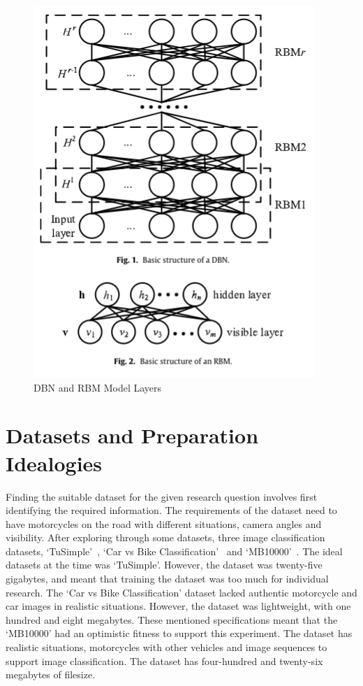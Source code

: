 \documentclass[12pt]{report} %
\begin{document}
		\begin{figure}[htp]
			\centering
			\includegraphics[width=0.75\columnwidth]{Figures/literature_review/proposal/DBNRBMLayers.png}
			\caption{DBN and RBM Model Layers~\cite{zhao_parallel_2019}}
			\label{fig:dbnRBMLayers}
		\end{figure}

	\section{Datasets and Preparation Idealogies}
		Finding the suitable dataset for the given research question involves first identifying the required information. The requirements of the dataset need to have motorcycles on the road with different situations, camera angles and visibility. After exploring through some datasets, three image classification datasets, `TuSimple'~\cite{jeong_end--end_2017}, `Car vs Bike Classification'~\cite{deepnets_car_nodate} and `MB10000'~\cite{espinosa_motorcycle_2018}. The ideal datasets at the time was `TuSimple'. However, the dataset was twenty-five gigabytes, and meant that training the dataset was too much for individual research. The `Car vs Bike Classification' dataset lacked authentic motorcycle and car images in realistic situations. However, the dataset was lightweight, with one hundred and eight megabytes. These mentioned specifications meant that the `MB10000' had an optimistic fitness to support this experiment. The dataset has realistic situations, motorcycles with other vehicles and image sequences to support image classification. The dataset has four-hundred and twenty-six megabytes of filesize.
\end{document}
